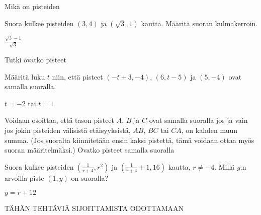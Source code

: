 \begin{tehtavasivu}
\begin{tehtava}
Mikä on pisteiden
\begin{vastaus}
\end{vastaus}
\end{tehtava}

\begin {tehtava}
Suora kulkee pisteiden $(3, 4)$ ja $(\sqrt{3}, 1)$ kautta. Määritä suoran kulmakerroin.
\begin {vastaus}
$\frac{\sqrt{3}-1}{\sqrt{3}}$
\end {vastaus}
\end {tehtava}

\sarjaB %

\begin{tehtava}
Tutki ovatko pisteet  
\begin{vastaus}
\end{vastaus}
\end{tehtava}

\begin{tehtava}
Määritä luku $t$ niin, että pisteet $(-t+3, -4)$, $(6, t-5)$ ja $(5, -4)$ ovat samalla suoralla.
\begin{vastaus}
$t=-2$ tai $t=1$
\end{vastaus}
\end{tehtava}

\begin{tehtava}
Voidaan osoittaa, että tason pisteet $A$, $B$ ja $C$ ovat samalla suoralla jos ja vain jos jokin pisteiden välisistä etäisyyksistä, $AB$, $BC$ tai $CA$, on kahden muun summa. (Jos suoralta kiinnitetään ensin kaksi pistettä, tämä voidaan ottaa myös suoran määritelmäksi.) Ovatko pisteet samalla suoralla
	\begin{vastaus}
	\end{vastaus}
\end{tehtava}

\sarjaC %

\begin{tehtava}
Suora kulkee pisteiden $(\frac{1}{r+4}, r^2)$ ja $(\frac{1}{r+4}+1, 16)$ kautta, $r \neq -4$. Millä $y$:n arvoilla piste $(1,y)$ on suoralla?
	\begin{vastaus}
	$y = r+12$
	\end{vastaus}
\end{tehtava}

\sarjaD %

TÄHÄN TEHTÄVIÄ SIJOITTAMISTA ODOTTAMAAN

\end{tehtavasivu}
